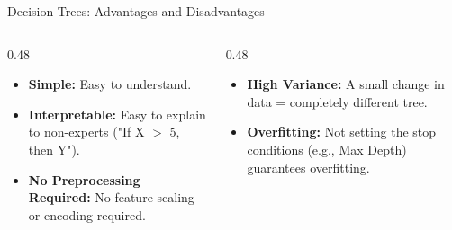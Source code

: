\begin{frame}{Decision Trees: Advantages and Disadvantages}
    \begin{columns}[T]
        \begin{column}{0.48\textwidth}
            \begin{tcolorbox}[colback=green!5, title=\textbf{The Advantages}]
                \small
                \begin{itemize}
                    \item \textbf{Simple:} Easy to understand.
                    \item \textbf{Interpretable:} Easy to explain to non-experts ("If X $>$ 5, then Y").
                    \item \textbf{No Preprocessing Required:} No feature scaling or encoding required.
                
                \end{itemize}
            \end{tcolorbox}
        \end{column}
        \begin{column}{0.48\textwidth}
            \begin{tcolorbox}[colback=red!5, title=\textbf{The Disadvantages}]
                \small
                \begin{itemize}
                    \item \textbf{High Variance:} A small change in data = completely different tree.
                    \item \textbf{Overfitting:} Not setting the stop conditions (e.g., Max Depth) guarantees overfitting.
                \end{itemize}
            \end{tcolorbox}
        \end{column}
    \end{columns}
\end{frame}

